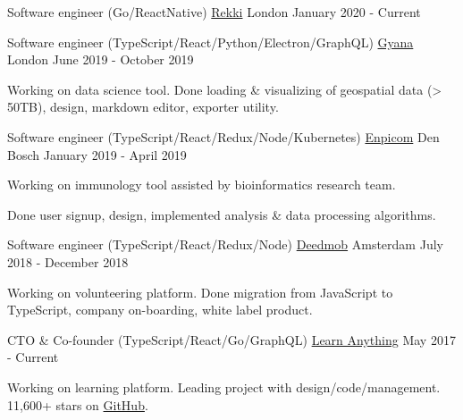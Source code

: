 
\begin{cventries}

  \cventry
    {Software engineer (Go/ReactNative)}
    {\href{https://www.rekki.com}{Rekki}}
    {London}
    {January 2020 - Current}
     {
    }

  \cventry
    {Software engineer (TypeScript/React/Python/Electron/GraphQL)}
    {\href{https://www.gyana.co.uk}{Gyana}}
    {London}
    {June 2019 - October 2019}
     {
      \begin{cvitems}
        \item {Working on data science tool. Done loading \& visualizing of geospatial data (> 50TB), design, markdown editor, exporter utility.}
      \end{cvitems}
    }

  \cventry
    {Software engineer (TypeScript/React/Redux/Node/Kubernetes)}
    {\href{https://www.enpicom.com}{Enpicom}}
    {Den Bosch}
    {January 2019 - April 2019}
     {
      \begin{cvitems}
        \item {Working on immunology tool assisted by bioinformatics research team.}
        \item {Done user signup, design, implemented analysis \& data processing algorithms.}
      \end{cvitems}
    }

  \cventry
    {Software engineer (TypeScript/React/Redux/Node)}
    {\href{https://www.deedmob.com}{Deedmob}}
    {Amsterdam}
    {July 2018 - December 2018}
     {
      \begin{cvitems}
        \item {Working on volunteering platform. Done migration from JavaScript to TypeScript, company on-boarding, white label product.}
      \end{cvitems}
    }

  \cventry
    {CTO \& Co-founder (TypeScript/React/Go/GraphQL)}
    {\href{https://learn-anything.xyz}{Learn Anything}}
    {}
    {May 2017 - Current}
     {
      \begin{cvitems}
        \item {Working on learning platform. Leading project with design/code/management. 11,600+ stars on \href{https://github.com/learn-anything/learn-anything}{GitHub}.}
      \end{cvitems}
    }

\end{cventries}
